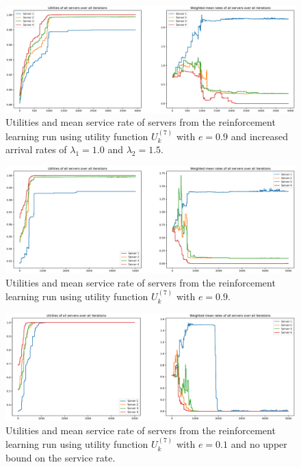 \begin{figure}[H]
    \includegraphics[width=\textwidth]{chapters/00_appendix/03_more_rl_results/Bin/utility_7_eps/u7_4_e09_Lambda_25.eps}
    \caption{Utilities and mean service rate of servers from the reinforcement
    learning run using utility function \(U_k^{(7)}\) with \(e = 0.9\) and
    increased arrival rates of \(\lambda_1 = 1.0\) and \(\lambda_2 = 1.5\).}
    \label{fig:RL_utility7_4_e09_Lambda_25}
\end{figure}


\begin{figure}[H]
    \includegraphics[width=\textwidth]{chapters/00_appendix/03_more_rl_results/Bin/utility_7_eps/u7_4_e09.eps}
    \caption{Utilities and mean service rate of servers from the reinforcement
    learning run using utility function \(U_k^{(7)}\) with \(e = 0.9\).}
    \label{fig:RL_utility7_4_e09}
\end{figure}



\begin{figure}[H]
    \includegraphics[width=\textwidth]{chapters/00_appendix/03_more_rl_results/Bin/utility_7_eps/u7_5_no_max_e01.eps}
    \caption{Utilities and mean service rate of servers from the reinforcement
    learning run using utility function \(U_k^{(7)}\) with \(e = 0.1\) and no
    upper bound on the service rate.}
    \label{fig:RL_utility7_5_no_max_e01}
\end{figure}


